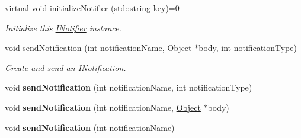 \begin{DoxyCompactItemize}
\item 
virtual void \hyperlink{class_pure_m_v_c_1_1_i_notifier_a28d7dbbe0726d4d52080546c5d79b232}{initializeNotifier} (std::string key)=0
\begin{DoxyCompactList}\small\item\em Initialize this \hyperlink{class_pure_m_v_c_1_1_i_notifier}{INotifier} instance. \item\end{DoxyCompactList}\item 
void \hyperlink{class_pure_m_v_c_1_1_notifier_a55a358ee2661ecc08400653016fdb497}{sendNotification} (int notificationName, \hyperlink{class_pure_m_v_c_1_1_object}{Object} $\ast$body, int notificationType)
\begin{DoxyCompactList}\small\item\em Create and send an {\ttfamily \hyperlink{class_pure_m_v_c_1_1_i_notification}{INotification}}. \item\end{DoxyCompactList}\item 
\hypertarget{class_pure_m_v_c_1_1_notifier_a6fa2ef42750287b410dcdd867479450b}{
void {\bfseries sendNotification} (int notificationName, int notificationType)}
\label{class_pure_m_v_c_1_1_notifier_a6fa2ef42750287b410dcdd867479450b}

\item 
\hypertarget{class_pure_m_v_c_1_1_notifier_a79a17268f222d42c1cc1f41a13da3b62}{
void {\bfseries sendNotification} (int notificationName, \hyperlink{class_pure_m_v_c_1_1_object}{Object} $\ast$body)}
\label{class_pure_m_v_c_1_1_notifier_a79a17268f222d42c1cc1f41a13da3b62}

\item 
\hypertarget{class_pure_m_v_c_1_1_notifier_a012642026e913c8e30d006e2e8f869c6}{
void {\bfseries sendNotification} (int notificationName)}
\label{class_pure_m_v_c_1_1_notifier_a012642026e913c8e30d006e2e8f869c6}


\end{DoxyCompactItemize}
